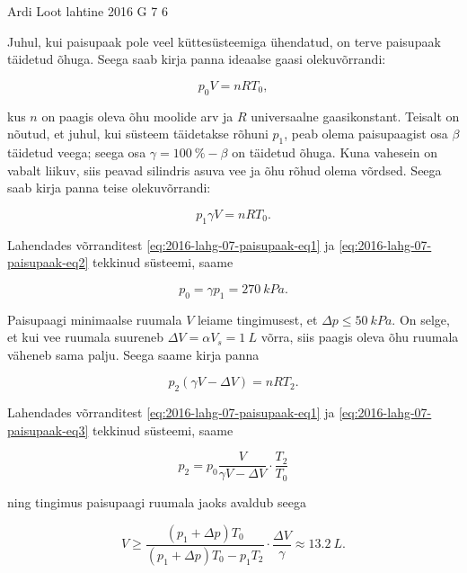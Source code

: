 \documentclass[11pt]{article}
\begin{document}
{%
{Ardi Loot} %
{lahtine} %
{2016} %
{G 7} %
{6} %
{

\ifSolution
Juhul, kui paisupaak pole veel küttesüsteemiga ühendatud, on terve
paisupaak täidetud õhuga. Seega saab kirja panna ideaalse gaasi olekuvõrrandi:

\begin{equation}
p_{0}V=nRT_{0},\label{eq:2016-lahg-07-paisupaak-eq1}
\end{equation}

\noindent kus $n$ on paagis oleva õhu moolide arv ja $R$ universaalne
gaasikonstant. Teisalt on nõutud, et juhul, kui süsteem täidetakse
rõhuni $p_{1}$, peab olema paisupaagist osa $\beta$ täidetud veega;
seega osa $\gamma=\SI{100}{\%}-\beta$ on täidetud õhuga. Kuna vahesein
on vabalt liikuv, siis peavad silindris asuva vee ja õhu rõhud olema
võrdsed. Seega saab kirja panna teise olekuvõrrandi:

\begin{equation}
p_{1}\gamma V=nRT_{0}.\label{eq:2016-lahg-07-paisupaak-eq2}
\end{equation}


\noindent Lahendades võrranditest \eqref{eq:2016-lahg-07-paisupaak-eq1} ja \eqref{eq:2016-lahg-07-paisupaak-eq2} tekkinud süsteemi, saame

\[
p_{0}=\gamma p_{1}=\SI{270}{kPa}.
\]


\noindent Paisupaagi minimaalse ruumala $V$ leiame tingimusest, et
$\Delta p\leq\SI{50}{kPa}.$ On selge, et kui vee ruumala suureneb
$\Delta V=\alpha V_{s}=\SI{1}{L}$ võrra, siis paagis oleva õhu ruumala
väheneb sama palju. Seega saame kirja panna

\begin{equation}
p_{2}\left(\gamma V-\Delta V\right)=nRT_{2}.\label{eq:2016-lahg-07-paisupaak-eq3}
\end{equation}


\noindent Lahendades võrranditest \eqref{eq:2016-lahg-07-paisupaak-eq1} ja \eqref{eq:2016-lahg-07-paisupaak-eq3}
tekkinud süsteemi, saame

\[
p_{2}=p_{0}\frac{V}{\gamma V-\Delta V}\cdot\frac{T_{2}}{T_{0}}
\]


\noindent ning tingimus paisupaagi ruumala jaoks avaldub seega

\[
V\geq\frac{\left(p_{1}+\Delta p\right)T_{0}}{\left(p_{1}+\Delta p\right)T_{0}-p_{1}T_{2}}\cdot\frac{\Delta V}{\gamma}\approx\SI{13.2}{L}.
\]
\fi
}

}
\end{document}
